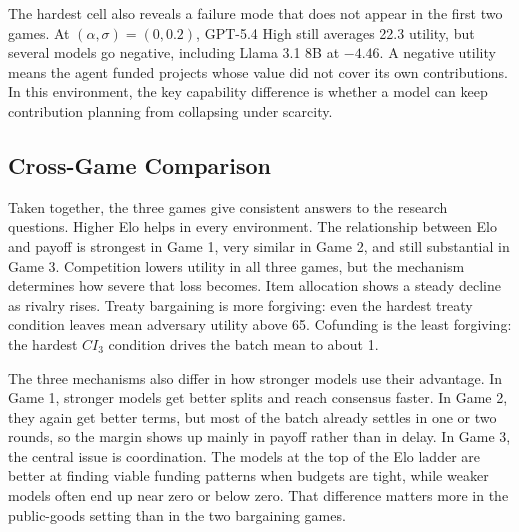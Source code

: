 The hardest cell also reveals a failure mode that does not appear in the first two games. At $(\alpha, \sigma) = (0, 0.2)$, GPT-5.4 High still averages 22.3 utility, but several models go negative, including Llama 3.1 8B at $-4.46$. A negative utility means the agent funded projects whose value did not cover its own contributions. In this environment, the key capability difference is whether a model can keep contribution planning from collapsing under scarcity.

\subsection{Cross-Game Comparison}
\label{sec:cross_game_results}

Taken together, the three games give consistent answers to the research questions. Higher Elo helps in every environment. The relationship between Elo and payoff is strongest in Game 1, very similar in Game 2, and still substantial in Game 3. Competition lowers utility in all three games, but the mechanism determines how severe that loss becomes. Item allocation shows a steady decline as rivalry rises. Treaty bargaining is more forgiving: even the hardest treaty condition leaves mean adversary utility above 65. Cofunding is the least forgiving: the hardest $CI_3$ condition drives the batch mean to about 1.

The three mechanisms also differ in how stronger models use their advantage. In Game 1, stronger models get better splits and reach consensus faster. In Game 2, they again get better terms, but most of the batch already settles in one or two rounds, so the margin shows up mainly in payoff rather than in delay. In Game 3, the central issue is coordination. The models at the top of the Elo ladder are better at finding viable funding patterns when budgets are tight, while weaker models often end up near zero or below zero. That difference matters more in the public-goods setting than in the two bargaining games.
